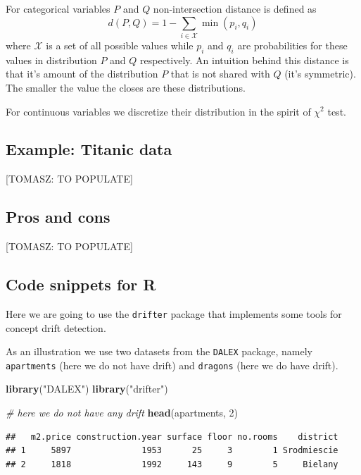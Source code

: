 \documentclass[12pt,]{krantz}
\newenvironment{Shaded}{\begin{snugshade}}{\end{snugshade}}
\newcommand{\CommentTok}[1]{\textcolor[rgb]{0.56,0.35,0.01}{\textit{#1}}}
\newcommand{\DecValTok}[1]{\textcolor[rgb]{0.00,0.00,0.81}{#1}}
\newcommand{\KeywordTok}[1]{\textcolor[rgb]{0.13,0.29,0.53}{\textbf{#1}}}
\newcommand{\NormalTok}[1]{#1}
\newcommand{\StringTok}[1]{\textcolor[rgb]{0.31,0.60,0.02}{#1}}
\begin{document}
For categorical variables \(P\) and \(Q\) non-intersection distance is defined as
\[
d(P,Q) = 1 - \sum_{i\in \mathcal X} \min(p_i, q_i)
\]
where \(\mathcal X\) is a set of all possible values while \(p_i\) and \(q_i\) are probabilities for these values in distribution \(P\) and \(Q\) respectively. An intuition behind this distance is that it's amount of the distribution \(P\) that is not shared with \(Q\) (it's symmetric). The smaller the value the closes are these distributions.

For continuous variables we discretize their distribution in the spirit of \(\chi^2\) test.

\hypertarget{DriftExample}{%
\subsection{Example: Titanic data}\label{DriftExample}}

{[}TOMASZ: TO POPULATE{]}

\hypertarget{DriftProsCons}{%
\subsection{Pros and cons}\label{DriftProsCons}}

{[}TOMASZ: TO POPULATE{]}

\hypertarget{DriftR}{%
\subsection{Code snippets for R}\label{DriftR}}

Here we are going to use the \texttt{drifter} package that implements some tools for concept drift detection.

As an illustration we use two datasets from the \texttt{DALEX} package, namely \texttt{apartments} (here we do not have drift) and \texttt{dragons} (here we do have drift).

\begin{Shaded}
\begin{Highlighting}[]
\KeywordTok{library}\NormalTok{(}\StringTok{"DALEX"}\NormalTok{)}
\KeywordTok{library}\NormalTok{(}\StringTok{"drifter"}\NormalTok{)}

\CommentTok{# here we do not have any drift}
\KeywordTok{head}\NormalTok{(apartments, }\DecValTok{2}\NormalTok{)}
\end{Highlighting}
\end{Shaded}

\begin{verbatim}
##   m2.price construction.year surface floor no.rooms    district
## 1     5897              1953      25     3        1 Srodmiescie
## 2     1818              1992     143     9        5     Bielany
\end{verbatim}
\end{document}
